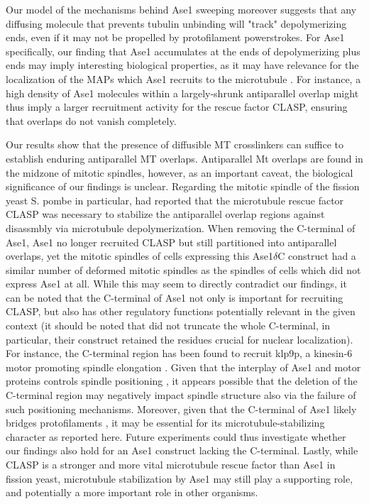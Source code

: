 Our model of the mechanisms behind Ase1 sweeping moreover suggests that any diffusing molecule that prevents tubulin unbinding will "track" depolymerizing ends, even if it may not be propelled by protofilament powerstrokes. For Ase1 specifically, our finding that Ase1 accumulates at the ends of depolymerizing plus ends may imply interesting biological properties, as it may have relevance for the localization of the MAPs which Ase1 recruits to the microtubule . For instance, a high density of Ase1 molecules within a largely-shrunk antiparallel overlap might thus imply a larger recruitment activity for the rescue factor CLASP, ensuring that overlaps do not vanish completely. \par
 
Our results show that the presence of diffusible MT crosslinkers can suffice to establish enduring antiparallel MT overlaps. Antiparallel Mt overlaps are found in the midzone of mitotic spindles, however, as an important caveat, the biological significance of our findings is unclear. Regarding the mitotic spindle of the fission yeast S. pombe in particular, \cite{Bratman2007b} had reported that the microtubule rescue factor CLASP was necessary to stabilize the antiparallel overlap regions against disassmbly via microtubule depolymerization. When removing the C-terminal of Ase1, Ase1 no longer recruited CLASP but still partitioned into antiparallel overlaps, yet the mitotic spindles of cells expressing this Ase1$\delta$C construct had a similar number of deformed mitotic spindles as the spindles of cells which did not express Ase1 at all. While this may seem to directly contradict our findings, it can be noted that the C-terminal of Ase1 not only is important for recruiting CLASP, but also has other regulatory functions potentially relevant in the given context (it should be noted that \cite{Bratman2007b} did not truncate the whole C-terminal, in particular, their construct retained the residues crucial for nuclear localization). For instance, the C-terminal region has been found to recruit klp9p, a kinesin-6 motor promoting spindle elongation . Given that the interplay of Ase1 and motor proteins controls spindle positioning , it appears possible that the deletion of the C-terminal region may negatively impact spindle structure also via the failure of such positioning mechanisms. Moreover, given that the C-terminal of Ase1 likely bridges protofilaments , it may be essential for its microtubule-stabilizing character as reported here. Future experiments could thus investigate whether our findings also hold for an Ase1 construct lacking the C-terminal. Lastly, while CLASP is a stronger and more vital microtubule rescue factor than Ase1 in fission yeast, microtubule stabilization by Ase1 may still play a supporting role, and potentially a more important role in other organisms. \par

